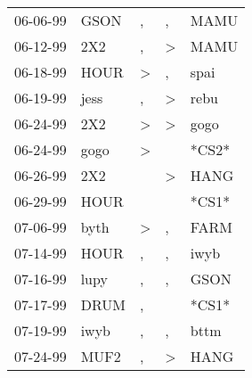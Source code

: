 \begin{supertabular}{p{0.07\textwidth}p{0.06\textwidth}p{0.02\textwidth}p{0.02\textwidth}p{0.06\textwidth}}
          06-06-99\textsuperscript{} &           GSON\textsuperscript{} &                , &                , &           MAMU\textsuperscript{} \\
          06-12-99\textsuperscript{} &            2X2\textsuperscript{} &                , &     \textgreater &           MAMU\textsuperscript{} \\
          06-18-99\textsuperscript{} &           HOUR\textsuperscript{} &     \textgreater &                , &           spai\textsuperscript{} \\
          06-19-99\textsuperscript{} &           jess\textsuperscript{} &                , &     \textgreater &           rebu\textsuperscript{} \\
          06-24-99\textsuperscript{} &            2X2\textsuperscript{} &     \textgreater &     \textgreater &           gogo\textsuperscript{} \\
          06-24-99\textsuperscript{} &           gogo\textsuperscript{} &     \textgreater &                  &                            *CS2* \\
          06-26-99\textsuperscript{} &            2X2\textsuperscript{} &                  &     \textgreater &           HANG\textsuperscript{} \\
          06-29-99\textsuperscript{} &           HOUR\textsuperscript{} &                  &                  &                            *CS1* \\
          07-06-99\textsuperscript{} &           byth\textsuperscript{} &     \textgreater &                , &           FARM\textsuperscript{} \\
          07-14-99\textsuperscript{} &           HOUR\textsuperscript{} &                , &                , &           iwyb\textsuperscript{} \\
          07-16-99\textsuperscript{} &           lupy\textsuperscript{} &                , &                , &           GSON\textsuperscript{} \\
          07-17-99\textsuperscript{} &           DRUM\textsuperscript{} &                , &                  &                            *CS1* \\
          07-19-99\textsuperscript{} &           iwyb\textsuperscript{} &                , &                , &           bttm\textsuperscript{} \\
          07-24-99\textsuperscript{} &           MUF2\textsuperscript{} &                , &     \textgreater &           HANG\textsuperscript{} \\

\end{supertabular}
